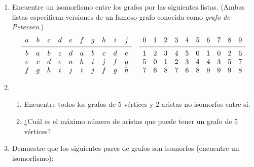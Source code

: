 \documentclass[a4paper,12pt,twoside,spanish,reqno]{amsbook}
\numberwithin{equation}{section}
\begin{document}
\begin{enumerate}


\item Encuentre un isomorfismo entre los grafos por las siguientes listas. (Ambas listas especifican versiones de un famoso grafo conocida como {\it grafo de Petersen}.)
    \begin{equation*}
        \begin{matrix}
            a&b&c&d&e&f&g&h&i&j\\[.1cm] \hline\\[-.3cm]
            b&a&b&c&d&a&b&c&d&e\\
            e&c&d&e&a&h&i&j&f&g\\
            f&g&h&i&j&i&j&f&g&h
        \end{matrix}
        \qquad 
        \begin{matrix}
            0&1&2&3&4&5&6&7&8&9\\[.1cm]  \hline\\[-.3cm]
            1&2&3&4&5&0&1&0&2&6\\
            5&0&1&2&3&4&4&3&5&7\\
            7&6&8&7&6&8&9&9&9&8
        \end{matrix}
    \end{equation*}


\item
    \begin{enumerate}
        \item Encuentre todos los grafos de 5 vértices y 2 aristas no isomorfos entre sí.
        \item ¿Cuál es el máximo número de aristas que puede tener un grafo de 5 vértices?
    \end{enumerate}


\item Demuestre que los siguientes pares de grafos son isomorfos (encuentre un isomorfismo):


\end{enumerate}
\end{document}
